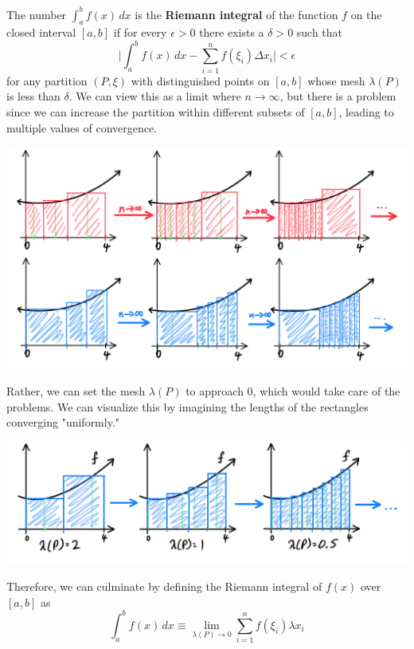\documentclass{article}
\begin{document}
      \begin{definition}
        The number $\int_a^b f(x)\,dx$ is the \textbf{Riemann integral} of the function $f$ on the closed interval $[a, b]$ if for every $\epsilon>0$ there exists a $\delta>0$ such that
        \[\Bigg| \int_a^b f(x)\,dx - \sum_{i=1}^n f(\xi_i) \Delta x_i \Bigg| < \epsilon\]
        for any partition $(P, \xi)$ with distinguished points on $[a, b]$ whose mesh $\lambda(P)$ is less than $\delta$. We can view this as a limit where $n \rightarrow \infty$, but there is a problem since we can increase the partition within different subsets of $[a,b]$, leading to multiple values of convergence. 
        \begin{center}
            \includegraphics[scale=0.28]{img/Riemann_Integral_Converging_onto_2_Numbers.PNG}
        \end{center}
        Rather, we can set the mesh $\lambda(P)$ to approach $0$, which would take care of the problems. We can visualize this by imagining the lengths of the rectangles converging "uniformly."
        \begin{center}
            \includegraphics[scale=0.28]{img/Riemann_Integral_Limit_Mesh_goes_to_0.PNG}
        \end{center}
        Therefore, we can culminate by defining the Riemann integral of $f(x)$ over $[a,b]$ as 
        \[\int_a^b f(x)\,dx \equiv \lim_{\lambda(P) \rightarrow 0} \sum_{i=1}^n f(\xi_i) \lambda x_i\]
      \end{definition}
\end{document}
